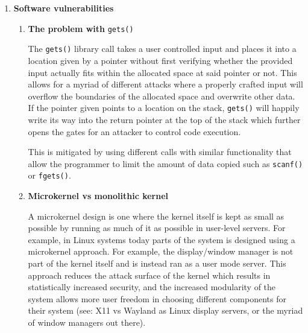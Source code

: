 \documentclass{article}
\begin{document}
\begin{enumerate}
    \item \textbf{Software vulnerabilities}
          \begin{enumerate}
              \item \textbf{The problem with} \verb+gets()+

                    The \verb+gets()+ library call takes a user controlled input and places it into a location given by a pointer without first verifying whether the provided input actually fits within the allocated space at said pointer or not. This allows for a myriad of different attacks where a properly crafted input will overflow the boundaries of the allocated space and overwrite other data. If the pointer given points to a location on the stack, \verb+gets()+ will happily write its way into the return pointer at the top of the stack which further opens the gates for an attacker to control code execution.

                    This is mitigated by using different calls with similar functionality that allow the programmer to limit the amount of data copied such as \verb+scanf()+ or \verb+fgets()+.
            
            \item \textbf{Microkernel vs monolithic kernel}
            
                A microkernel design is one where the kernel itself is kept as small as possible by running as much of it as possible in user-level servers. For example, in Linux systems today parts of the system is designed using a microkernel approach. For example, the display/window manager is not part of the kernel itself and is instead ran as a user mode server. This approach reduces the attack surface of the kernel which results in statistically increased security, and the increased modularity of the system allows more user freedom in choosing different components for their system (see: X11 vs Wayland as Linux display servers, or the myriad of window managers out there).
          \end{enumerate}
\end{enumerate}
\end{document}
